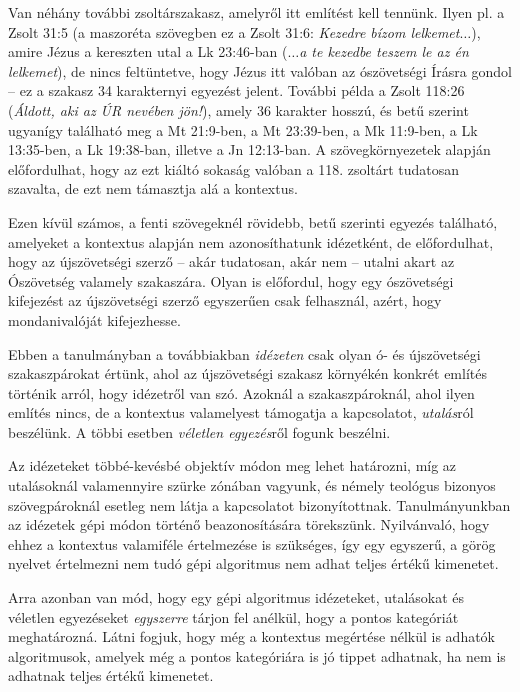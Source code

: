 \documentclass{article}
\begin{document}
Van néhány további zsoltárszakasz, amelyről itt említést kell tennünk. Ilyen pl. a Zsolt 31:5
(a maszoréta szövegben ez a Zsolt 31:6:
\textit{Kezedre bízom lelkemet$\ldots$}), amire Jézus a kereszten
utal a Lk 23:46-ban (\textit{$\ldots$a te kezedbe teszem le az én lelkemet}), de nincs feltüntetve,
hogy Jézus itt valóban az ószövetségi Írásra gondol -- ez a szakasz 34 karakternyi egyezést jelent.
További példa a Zsolt 118:26 (\textit{Áldott, aki az ÚR nevében jön!}), amely 36 karakter hosszú,
és betű szerint ugyanígy található meg a Mt 21:9-ben, a Mt 23:39-ben, a Mk 11:9-ben,
a Lk 13:35-ben, a Lk 19:38-ban, illetve a Jn 12:13-ban. A szövegkörnyezetek alapján előfordulhat,
hogy az ezt kiáltó sokaság valóban a 118. zsoltárt tudatosan szavalta, de ezt nem támasztja alá a kontextus.

Ezen kívül számos, a fenti szövegeknél rövidebb, betű szerinti egyezés található, amelyeket
a kontextus alapján nem azonosíthatunk idézetként, de előfordulhat, hogy az újszövetségi szerző
-- akár tudatosan, akár nem -- utalni akart az Ószövetség valamely szakaszára. Olyan is előfordul,
hogy egy ószövetségi kifejezést az újszövetségi szerző egyszerűen csak felhasznál, azért, hogy
mondanivalóját kifejezhesse.

Ebben a tanulmányban a továbbiakban \textit{idézeten} csak olyan ó- és újszövetségi szakaszpárokat értünk,
ahol az újszövetségi szakasz környékén konkrét említés történik arról,
hogy idézetről van szó. Azoknál a szakaszpároknál,
ahol ilyen említés nincs, de a kontextus valamelyest támogatja a kapcsolatot, \textit{utalás}ról beszélünk.
A többi esetben \textit{véletlen egyezés}ről fogunk beszélni.

Az idézeteket többé-kevésbé objektív módon meg lehet határozni, míg az utalásoknál valamennyire szürke
zónában vagyunk, és némely teológus bizonyos szövegpároknál esetleg nem látja
a kapcsolatot bizonyítottnak. Tanulmányunkban az idézetek gépi módon történő beazonosítására törekszünk.
Nyilvánvaló, hogy ehhez a kontextus valamiféle értelmezése is szükséges, így egy egyszerű,
a görög nyelvet értelmezni nem tudó gépi algoritmus nem adhat teljes értékű kimenetet.

Arra azonban van mód, hogy egy gépi algoritmus idézeteket, utalásokat és véletlen egyezéseket \textit{egyszerre}
tárjon fel anélkül, hogy a pontos kategóriát meghatározná. Látni fogjuk, hogy még a kontextus
megértése nélkül is adhatók algoritmusok, amelyek még a pontos kategóriára is jó tippet adhatnak,
ha nem is adhatnak teljes értékű kimenetet.
\end{document}
